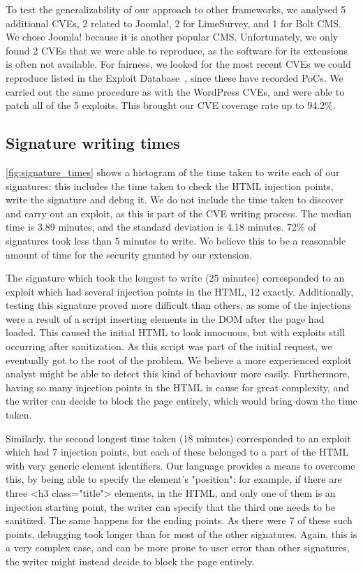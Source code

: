 To test the generalizability of our approach to other frameworks, we
analysed 5 additional CVEs, 2 related to Joomla!, 2 for LimeSurvey,
and 1 for Bolt CMS.  We chose Joomla! because it is another
popular \ac{CMS}. Unfortunately, we only found 2 CVEs
that we were able to reproduce, as the software for its extensions is
often not available. For fairness, we looked for the most recent CVEs
we could reproduce listed in the Exploit Database~\cite{exploitdb}, since
these have recorded \acp{PoC}. We carried out the same
procedure as with the WordPress CVEs, and were able to patch all of
the 5 exploits. This brought our CVE coverage rate up to 94.2\%.

\subsection{Signature writing times} \label{signature_times}

 \autoref{fig:signature_times} shows a histogram of the time taken to write each of our signatures: this includes the time taken to check the HTML injection points, write the signature and debug it. We do not include the time taken to discover and carry out an exploit, as this is part of the CVE writing process. The median time is 3.89 minutes, and the standard deviation is 4.18 minutes. 72\% of signatures took less than 5 minutes to write. We believe this to be a reasonable amount of time for the security granted by our extension.

The signature which took the longest to write (25 minutes) corresponded to an exploit which had several injection points in the HTML, 12 exactly. Additionally, testing this signature proved more difficult than others, as some of the injections were a result of a script inserting elements in the DOM after the page had loaded. This caused the initial HTML to look innocuous, but with exploits still occurring after sanitization. As this script was part of the initial request, we eventually got to the root of the problem. We believe a more experienced exploit analyst might be able to detect this kind of behaviour more easily. Furthermore, having so many injection points in the HTML is cause for great complexity, and the writer can decide to block the page entirely, which would bring down the time taken.

Similarly, the second longest time taken (18 minutes) corresponded to an exploit which had 7 injection points, but each of these belonged to a part of the HTML with very generic element identifiers. Our language provides a means to overcome this, by being able to specify the element's "position": for example, if there are three <h3 class="title"> elements, in the HTML, and only one of them is an injection starting point, the writer can specify that the third one needs to be sanitized. The same happens for the ending points. As there were 7 of these such points, debugging took longer than for most of the other signatures. Again, this is a very complex case, and can be more prone to user error than other signatures, the writer might instead decide to block the page entirely.

